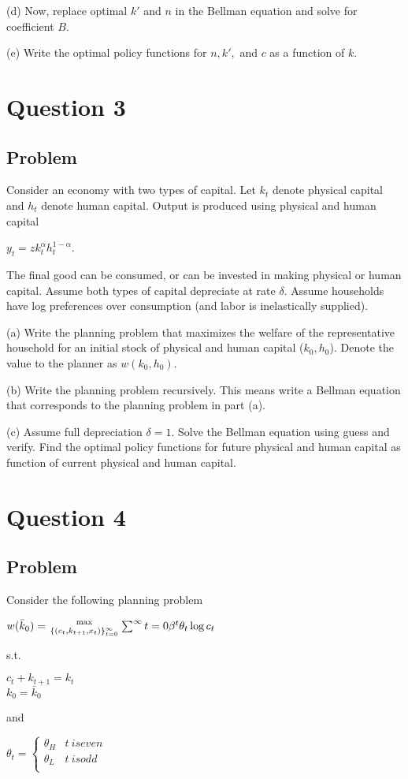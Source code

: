 \documentclass[10pt, a4paper]{article}
\begin{document}
    (d) Now, replace optimal $k'$ and $n$ in the Bellman equation and solve for coefficient $B$.

    (e) Write the optimal policy functions for $n,k',$ and $c$ as a function of $k$.
\section{Question 3}
  \subsection{Problem}
    Consider an economy with two types of capital. Let $k_t$ denote physical capital and $h_t$ denote human capital. Output is produced using physical and human capital
    \begin{center}
      $y_t=zk_t^{\alpha}h_t^{1-\alpha}$.
    \end{center}
    The final good can be consumed, or can be invested in making physical or human capital. Assume both types of capital depreciate at rate $\delta$. Assume households have log preferences over consumption (and labor is inelastically supplied).

    (a) Write the planning problem that maximizes the welfare of the representative household for an initial stock of physical and human capital ($k_0,h_0$). Denote the value to the planner as $w(k_0,h_0)$.

    (b) Write the planning problem recursively. This means write a Bellman equation that corresponds to the planning problem in part (a).

    (c) Assume full depreciation $\delta=1$. Solve the Bellman equation using guess and verify. Find the optimal policy functions for future physical and human capital as function of current physical and human capital.
\section{Question 4}
  \subsection{Problem}
    Consider the following planning problem
    \begin{center}
      $w(\bar k_0)={\max\atop{\{(c_t,k_{t+1},x_t)\}_{t=0}^{\infty}}}\sum^{\infty}{t=0}\beta^t\theta_t\log c_t$
    \end{center}
    s.t.
    \begin{center}
      $c_t+k_{t+1} = k_t$ \\
      $k_0=\bar k_0$
    \end{center}
    and
    \begin{center}
      $\theta_t = \begin{cases} 
        \theta_H & t \ {is even} \\
        \theta_L & t \ {is odd} \\
      \end{cases}$
    \end{center}
    
\end{document}
